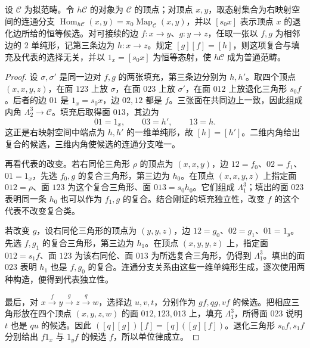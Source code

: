 \begin{proposition}\label{b4:prop:F-homotopy-composition}
	设 \(\mathcal C\) 为拟范畴。令 \(h\mathcal C\) 的对象为 \(\mathcal C\) 的顶点；对顶点 \(x,y\)，取态射集合为右映射空间的连通分支 \(\operatorname{Hom}_{h\mathcal C}(x,y)=\pi_0\operatorname{Map}_{\mathcal C}(x,y)\)，并以 \([s_0x]\) 表示顶点 \(x\) 的退化边所给的恒等候选。对可接续的边 \(f:x\rightarrow y\)、\(g:y\rightarrow z\)，任取一张以 \(f,g\) 为相邻边的 2 单纯形，记第三条边为 \(h:x\rightarrow z\)。规定 \([g][f]=[h]\)，则这项复合与填充及代表的选择无关，并以 \(1_x=[s_0x]\) 为恒等态射，使 \(h\mathcal C\) 成为普通范畴。
\end{proposition}
\begin{proof}
	设 \(\sigma,\sigma'\) 是同一边对 \(f,g\) 的两张填充，第三条边分别为 \(h,h'\)。取四个顶点 \((x,x,y,z)\)，在面 \(123\) 上放 \(\sigma\)，在面 \(023\) 上放 \(\sigma'\)，在面 \(012\) 上放退化三角形 \(s_0f\)。后者的边 \(01\) 是 \(1_x=s_0x\)，边 \(02,12\) 都是 \(f\)。三张面在共同边上一致，因此组成内角 \(\Lambda_2^3\rightarrow\mathcal C\)。填充后取得面 \(013\)，其边为
	\[
		01=1_x,\qquad 03=h',\qquad 13=h.
	\]
	这正是右映射空间中端点为 \(h,h'\) 的一维单纯形，故 \([h]=[h']\)。二维内角给出复合的候选，三维内角使候选的连通分支唯一。

	再看代表的改变。若右同伦三角形 \(\rho\) 的顶点为 \((x,x,y)\)，边 \(12=f_0\)、\(02=f_1\)、\(01=1_x\)，先选 \(f_0,g\) 的复合三角形，第三边为 \(h_0\)。在顶点 \((x,x,y,z)\) 上指定面 \(012=\rho\)、面 \(123\) 为这个复合三角形、面 \(013=s_0h_0\)。它们组成 \(\Lambda_1^3\)；填出的面 \(023\) 表明同一条 \(h_0\) 也可以作为 \(f_1,g\) 的复合。结合刚证的填充独立性，改变 \(f\) 的这个代表不改变复合类。

	若改变 \(g\)，设右同伦三角形的顶点为 \((y,y,z)\)，边 \(12=g_0\)、\(02=g_1\)、\(01=1_y\)。先选 \(f,g_1\) 的复合三角形，第三边为 \(h_1\)。在顶点 \((x,y,y,z)\) 上，指定面 \(012=s_1f\)、面 \(123\) 为该右同伦、面 \(013\) 为所选复合三角形，仍得到 \(\Lambda_1^3\)。填出的面 \(023\) 表明 \(h_1\) 也是 \(f,g_0\) 的复合。连通分支关系由这些一维单纯形生成，逐次使用两种构造，便得到代表独立性。

	最后，对 \(x\xrightarrow f y\xrightarrow g z\xrightarrow q w\)，选择边 \(u,v,t\)，分别作为 \(gf,qg,vf\) 的候选。把相应三角形放在四个顶点 \((x,y,z,w)\) 的面 \(012,123,013\) 上，填充 \(\Lambda_1^3\)，所得面 \(023\) 说明 \(t\) 也是 \(qu\) 的候选。因此 \(([q][g])[f]=[q]([g][f])\)。退化三角形 \(s_0f,s_1f\) 分别给出 \(f1_x\) 与 \(1_yf\) 的候选 \(f\)，所以单位律成立。
\end{proof}

